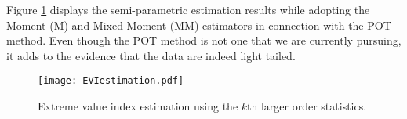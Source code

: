 \documentclass[a4paper]{article}
\begin{document}
Figure \ref{fig:POTEst} displays the semi-parametric estimation results while adopting the Moment (M) and Mixed Moment (MM) estimators in connection with the POT method. Even though the POT method is not one that we are currently pursuing, it adds to the evidence that the data are indeed light tailed.

\begin{figure}
\begin{center}
\texttt{[image: EVIestimation.pdf]}
\caption{Extreme value index estimation using the $k$th larger order statistics.} \label{fig:POTEst}
\end{center}
\end{figure}





\end{document}
